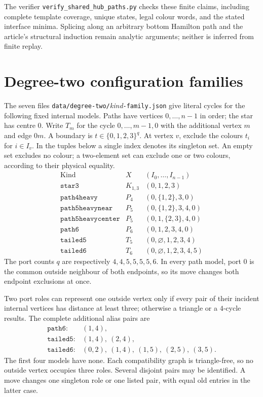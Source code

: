 The verifier \texttt{verify\_shared\_hub\_paths.py} checks these finite
claims, including complete template coverage, unique states, legal colour
words, and the stated interface minima.
Splicing along an
arbitrary bottom Hamilton path and the article's structural induction
remain analytic arguments; neither is inferred from finite replay.

\clearpage
\section{Degree-two configuration families}
\label{app:degree-two-family-certificates}
The seven files \texttt{data/degree-two/}\emph{kind}\texttt{-family.json}
give literal cycles for the following fixed internal models. Paths have
vertices $0,\ldots,n-1$ in order; the star has centre $0$.
Write $T_m$ for the cycle $0,\ldots,m-1,0$ with the additional vertex
$m$ and edge $0m$. A boundary is $t\in\{0,1,2,3\}^q$.
At vertex $v$, exclude the colours $t_i$ for $i\in I_v$.
In the tuples below a single index denotes its singleton set.
An empty set excludes no colour; a two-element set can exclude one
or two colours, according to their physical equality.
\[
\begin{array}{lcl}
\text{Kind}&X&(I_0,\ldots,I_{n-1})\\ \hline
\mathtt{star3}&K_{1,3}&(0,1,2,3)\\
\mathtt{path4heavy}&P_4&(0,\{1,2\},3,0)\\
\mathtt{path5heavynear}&P_5&(0,\{1,2\},3,4,0)\\
\mathtt{path5heavycenter}&P_5&(0,1,\{2,3\},4,0)\\
\mathtt{path6}&P_6&(0,1,2,3,4,0)\\
\mathtt{tailed5}&T_5&(0,\varnothing,1,2,3,4)\\
\mathtt{tailed6}&T_6&(0,\varnothing,1,2,3,4,5)
\end{array}
\]
The port counts $q$ are respectively $4,4,5,5,5,5,6$.
In every path model, port $0$ is the common outside neighbour of both
endpoints, so its move changes both endpoint exclusions at once.

Two port roles can represent one outside vertex only if every pair
of their incident internal vertices has distance at least three;
otherwise a triangle or a $4$-cycle results. The complete additional
alias pairs are
\[
\begin{array}{ll}
\mathtt{path6}:&(1,4),\\
\mathtt{tailed5}:&(1,4),\ (2,4),\\
\mathtt{tailed6}:&(0,2),\ (1,4),\ (1,5),\ (2,5),\ (3,5).
\end{array}
\]
The first four models have none. Each compatibility graph is
triangle-free, so no outside vertex occupies three roles. Several
disjoint pairs may be identified. A move changes one singleton role
or one listed pair, with equal old entries in the latter case.


